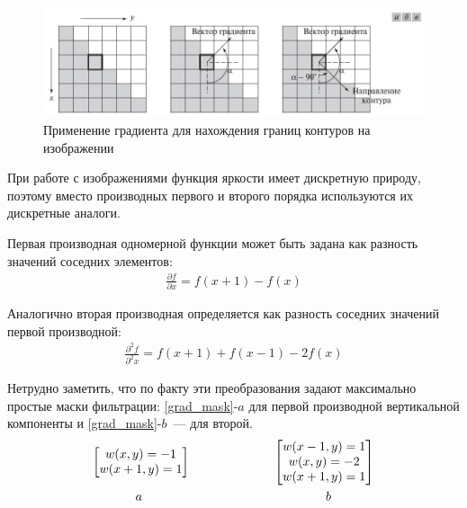 \documentclass[12pt]{article} %
\begin{document}
\begin{figure}[h]
	
	\centering
	
	\includegraphics[width=0.7\linewidth]{grad.jpg}
	
	\caption{Применение градиента для нахождения границ контуров на изображении}
	
	\label{fig:grad}
	
\end{figure}

\newpage

При работе с изображениями функция яркости имеет дискретную природу, поэтому вместо производных первого и второго порядка используются их дискретные аналоги.

Первая производная одномерной функции может быть задана как разность значений соседних элементов:
\begin{gather}\label{first}
	\frac{\partial f}{\partial x}=
	f(x+1) - f(x)
\end{gather}

Аналогично вторая производная определяется как разность соседних значений первой производной:
\begin{gather}\label{second}
	\frac{\partial^2 f}{\partial^2 x}=
	f(x+1) + f(x-1) -2f(x)
\end{gather}

Нетрудно заметить, что по факту эти преобразования задают максимально простые маски фильтрации:
\ref{grad_mask}-$a$ для первой производной вертикальной компоненты и \ref{grad_mask}-$b$~--- для второй.
\begin{gather}\label{grad_mask}
	\begin{bmatrix} w(x,y)=-1 \\ w(x+1,y)=1 \end{bmatrix}
	~~~~~~~~~~~~~~~~~~~~
	\begin{bmatrix} 
	w(x-1,y)=1 \\ w(x,y)=-2 \\ w(x+1,y)=1 \\
	\end{bmatrix}\\
a~~~~~~~~~~~~~~~~~~~~~~~~~~~~~~~~~~~~~~~~~~~~b\notag
\end{gather}
\end{document}
